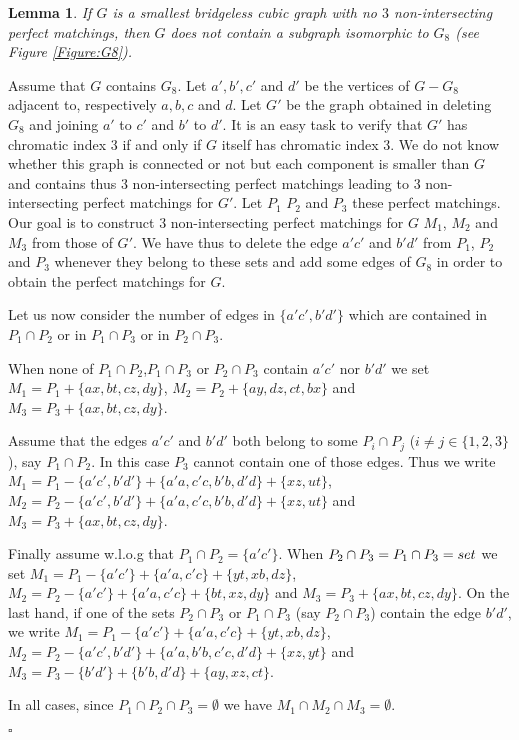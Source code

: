 \documentclass{elsart}
\theoremstyle{plain} \theoremheaderfont{\scshape}
\newtheorem{Lem}[Thm]{\bf Lemma}
\newenvironment{Prf}{{\bf \noindent Proof } }{\hfill$\square$\\}
\begin{document}
\begin{Lem}\label{Lemma:Graph8}  If $G$ is a smallest bridgeless
cubic graph with no $3$ non-intersecting perfect matchings, then $G$
does not contain a subgraph isomorphic to $G_8$  (see Figure
\ref{Figure:G8}).
\end{Lem}
\begin{Prf}
Assume that $G$ contains $G_8$. Let $a', b', c'$ and $d'$ be the
vertices of $G-G_8$ adjacent to, respectively $a, b, c$ and $d$. Let
$G'$ be the graph obtained in deleting $G_8$ and joining $a'$ to
$c'$ and $b'$ to $d'$. It is an easy task to verify that $G'$ has
chromatic index $3$ if and only if $G$ itself has chromatic index
$3$.   We do not know whether this graph is connected or not but
each component is smaller than $G$ and contains thus $3$
non-intersecting perfect matchings leading to $3$ non-intersecting
perfect matchings for $G'$. Let $P_1$ $P_2$ and $P_3$ these perfect
matchings. Our goal is to construct $3$ non-intersecting perfect
matchings for $G$ $M_1$, $M_2$ and $M_3$ from those of $G'$. We have
thus to delete the edge $a'c'$ and $b'd'$ from $P_1$, $P_2$ and
$P_3$ whenever they belong to these sets and add some edges of $G_8$
in order to obtain the perfect matchings for $G$.

Let us now consider the number of edges in $\{a'c',b'd'\}$ which are
contained in $P_1\cap P_2$ or in $P_1\cap P_3$ or in $P_2\cap P_3$.

When none of $P_1\cap P_2$,$P_1\cap P_3$ or $P_2\cap P_3$ contain
$a'c'$ nor $b'd'$ we set $M_1=P_1+\{ax, bt, cz, dy\}$, $M_2=P_2+\{
ay, dz, ct, bx\}$ and $M_3=P_3+\{ax, bt, cz, dy\}$.

Assume that the edges $a'c'$ and $b'd'$ both belong to some $P_i\cap
P_j$ ($i\neq j\in\{1,2,3\}$), say $P_1\cap P_2$. In this case $P_3$
cannot contain one of those edges. Thus we write
$M_1=P_1-\{a'c',b'd'\}+\{a'a,c'c,b'b,d'd\}+\{xz,
ut\}$,$M_2=P_2-\{a'c',b'd'\}+\{a'a,c'c,b'b,d'd\}+\{xz, ut\}$ and
$M_3=P_3+\{ax, bt, cz, dy\}$.

Finally assume w.l.o.g that $P_1\cap P_2=\{a'c'\}$. When $P_2\cap
P_3=P_1\cap P_3=\empty set$ we set $M_1=P_1-\{a'c'\}+\{a'a,
c'c\}+\{yt, xb, dz\}$, $M_2=P_2-\{a'c'\}+\{a'a, c'c\}+\{bt, xz,
dy\}$ and $M_3=P_3+\{ax, bt, cz, dy\}$. On the last hand, if one of
the sets $P_2\cap P_3$ or $P_1\cap P_3$ (say $P_2\cap P_3$) contain
the edge $b'd'$, we write $M_1=P_1-\{a'c'\}+\{a'a, c'c\}+\{yt, xb,
dz\}$,$M_2=P_2-\{a'c',b'd'\}+\{a'a, b'b,c'c, d'd\}+\{xz, yt\}$ and
$M_3=P_3-\{b'd'\}+\{b'b,d'd\}+\{ay,xz,ct\}$.

In all cases, since $P_1\cap P_2\cap P_3=\emptyset$ we have $M_1\cap
M_2\cap M_3=\emptyset$.

\end{Prf}
\end{document}
